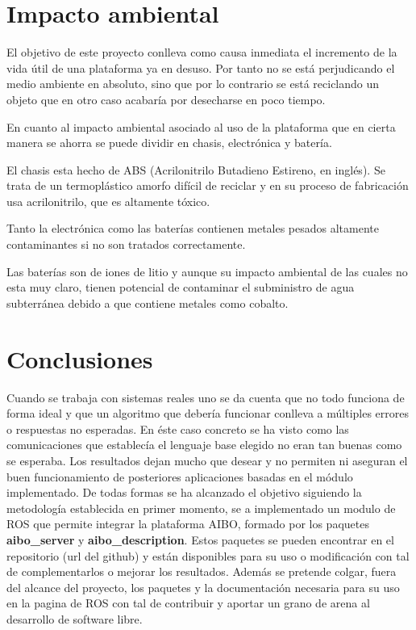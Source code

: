 \documentclass[12pt,a4paper,final,twoside]{book}
\begin{document}
\newpage

\chapter{Impacto ambiental}
\thispagestyle{fancy}
El objetivo de este proyecto conlleva como causa inmediata el incremento de la vida útil de una plataforma ya en desuso. Por tanto no se está perjudicando el medio ambiente en absoluto, sino que por lo contrario se está reciclando un objeto que en otro caso acabaría por desecharse en poco tiempo.

En cuanto al impacto ambiental asociado al uso de la plataforma que en cierta manera se ahorra se puede dividir en chasis, electrónica y batería.

El chasis esta hecho de ABS (Acrilonitrilo Butadieno Estireno, en inglés). Se trata de un termoplástico amorfo difícil de reciclar y en su proceso de fabricación usa acrilonitrilo, que es altamente tóxico.

Tanto la electrónica como las baterías contienen metales pesados altamente contaminantes si no son tratados correctamente.

Las baterías son de iones de litio y aunque su impacto ambiental de las cuales no esta muy claro, tienen potencial de contaminar el subministro de agua subterránea debido a que contiene metales como cobalto.


\newpage
\chapter*{Conclusiones}
\thispagestyle{fancy}


Cuando se trabaja con sistemas reales uno se da cuenta que no todo funciona de forma ideal y que un algoritmo que debería funcionar conlleva a múltiples errores o respuestas no esperadas. En éste caso concreto se ha visto como las comunicaciones que establecía el lenguaje base elegido no eran tan buenas como se esperaba. Los resultados dejan mucho que desear y no permiten ni aseguran el buen funcionamiento de posteriores aplicaciones basadas en el módulo implementado. De todas formas se ha alcanzado el objetivo siguiendo la metodología establecida en primer momento, se a implementado un modulo de ROS que permite integrar la plataforma AIBO, formado por los paquetes \textbf{aibo{\_}server} y \textbf{aibo{\_}description}. Estos paquetes se pueden encontrar en el repositorio (url del github) y están disponibles para su uso o modificación con tal de complementarlos o mejorar los resultados. Además se pretende colgar, fuera del alcance del proyecto, los paquetes y la documentación necesaria para su uso en la pagina de ROS con tal de contribuir y aportar un grano de arena al desarrollo de software libre.
\end{document}
